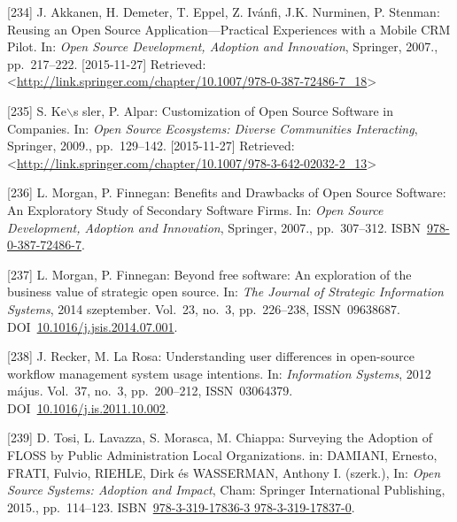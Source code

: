 \documentclass[12pt,magyar,a4paper,oneside]{scrreprt}
\begin{document}
\leavevmode\hypertarget{ref-akkanen_reusing_2007}{}%
{[}234{]} J. Akkanen, H. Demeter, T. Eppel, Z. Ivánfi, J.K. Nurminen, P.
Stenman: Reusing an Open Source Application---Practical Experiences with
a Mobile CRM Pilot. In: \emph{Open Source Development, Adoption and
Innovation}, Springer, 2007., pp.~217--222. {[}2015-11-27{]} Retrieved:
\textless{}\url{http://link.springer.com/chapter/10.1007/978-0-387-72486-7_18}\textgreater{}

\leavevmode\hypertarget{ref-kes_sler_customization_2009}{}%
{[}235{]} S. Ke\(\backslash\)s sler, P. Alpar: Customization of Open
Source Software in Companies. In: \emph{Open Source Ecosystems: Diverse
Communities Interacting}, Springer, 2009., pp.~129--142.
{[}2015-11-27{]} Retrieved:
\textless{}\url{http://link.springer.com/chapter/10.1007/978-3-642-02032-2_13}\textgreater{}

\leavevmode\hypertarget{ref-morgan_benefits_2007}{}%
{[}236{]} L. Morgan, P. Finnegan: Benefits and Drawbacks of Open Source
Software: An Exploratory Study of Secondary Software Firms. In:
\emph{Open Source Development, Adoption and Innovation}, Springer,
2007., pp.~307--312.
ISBN~\href{https://worldcat.org/isbn/978-0-387-72486-7}{978-0-387-72486-7}.

\leavevmode\hypertarget{ref-morgan_beyond_2014}{}%
{[}237{]} L. Morgan, P. Finnegan: Beyond free software: An exploration
of the business value of strategic open source. In: \emph{The Journal of
Strategic Information Systems}, 2014 szeptember. Vol.~23, no.~3,
pp.~226--238, ISSN~09638687.
DOI~\href{https://doi.org/10.1016/j.jsis.2014.07.001}{10.1016/j.jsis.2014.07.001}.

\leavevmode\hypertarget{ref-recker_understanding_2012}{}%
{[}238{]} J. Recker, M. La Rosa: Understanding user differences in
open-source workflow management system usage intentions. In:
\emph{Information Systems}, 2012 május. Vol.~37, no.~3, pp.~200--212,
ISSN~03064379.
DOI~\href{https://doi.org/10.1016/j.is.2011.10.002}{10.1016/j.is.2011.10.002}.

\leavevmode\hypertarget{ref-damiani_surveying_2015}{}%
{[}239{]} D. Tosi, L. Lavazza, S. Morasca, M. Chiappa: Surveying the
Adoption of FLOSS by Public Administration Local Organizations. in:
DAMIANI, Ernesto, FRATI, Fulvio, RIEHLE, Dirk és WASSERMAN, Anthony I.
(szerk.), In: \emph{Open Source Systems: Adoption and Impact}, Cham:
Springer International Publishing, 2015., pp.~114--123.
ISBN~\href{https://worldcat.org/isbn/978-3-319-17836-3\%20978-3-319-17837-0}{978-3-319-17836-3 978-3-319-17837-0}.
\end{document}
